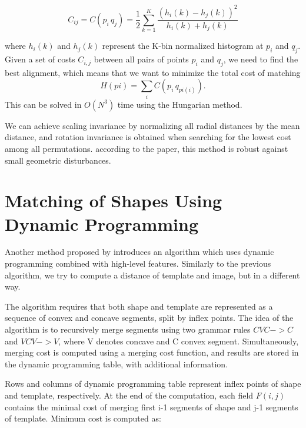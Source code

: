 \begin{equation*}
C_{ij} =  C(p_{i}\,q_{j}) = \frac{1}{2} \sum_{k=1}^{K} \frac{(h_{i}(k) - h_{j}(k))^2}{h_{i}(k) + h_{j}(k)}
\end{equation*}

where $ h_{i}(k) $ and $ h_{j}(k) $ represent the K-bin normalized histogram at $p_{i}$ and $q_{j}$. Given a set of costs $C_{i,j}$ between all pairs of points $p_{i}$ and $q_{j}$, we need to find the best alignment, which means that we want to minimize the total cost of matching 
\begin{equation*}
H(pi) = \sum_{i} C(p_{i}\,q_{pi(i)}).
\end{equation*}
This can be solved in $O(N^3)$ time using the Hungarian method\cite{simple}. 

We can achieve scaling invariance by normalizing all radial distances by the mean distance, and rotation invariance is obtained when searching for the lowest cost among all permutations. according to the paper, this method is robust against small geometric disturbances.

\section{Matching of Shapes Using Dynamic Programming}
Another method proposed by \citet{convex} introduces an algorithm which uses dynamic programming combined with high-level features. Similarly to the previous algorithm, we try to compute a distance of template and image, but in a different way.

The algorithm requires that both shape and template are represented as a sequence of convex and concave segments, split by inflex points. The idea of the algorithm is to recursively merge segments using two grammar rules $CVC -> C$ and $VCV -> V$, where V denotes concave and C convex segment. Simultaneously, merging cost is computed using a merging cost function, and results are stored in the dynamic programming table, with additional information.

Rows and columns of dynamic programming table represent inflex points of shape and template, respectively. At the end of the computation, each field $F(i,j)$ contains the minimal cost of merging first i-1 segments of shape and j-1 segments of template. Minimum cost is computed as:

